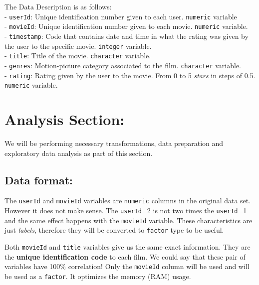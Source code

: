 \documentclass[
]{article}
\begin{document}
The Data Description is as follows:\\
- \texttt{userId}: Unique identification number given to each user.
\texttt{numeric} variable\\
- \texttt{movieId}: Unique identification number given to each movie.
\texttt{numeric} variable.\\
- \texttt{timestamp}: Code that contains date and time in what the
rating was given by the user to the specific movie. \texttt{integer}
variable.\\
- \texttt{title}: Title of the movie. \texttt{character} variable.\\
- \texttt{genres}: Motion-picture category associated to the film.
\texttt{character} variable.\\
- \texttt{rating}: Rating given by the user to the movie. From 0 to 5
\emph{stars} in steps of 0.5. \texttt{numeric} variable.\\
\newpage

\hypertarget{analysis-section}{%
\section{\texorpdfstring{\textbf{Analysis
Section:}}{Analysis Section:}}\label{analysis-section}}

We will be performing necessary transformations, data preparation and
exploratory data analysis as part of this section.

\hypertarget{data-format}{%
\subsection{\texorpdfstring{\textbf{Data
format:}}{Data format:}}\label{data-format}}

The \texttt{userId} and \texttt{movieId} variables are \texttt{numeric}
columns in the original data set. However it does not make sense. The
\texttt{userId}=2 is not two times the \texttt{userId}=1 and the same
effect happens with the \texttt{movieId} variable. These characteristics
are just \emph{labels}, therefore they will be converted to
\texttt{factor} type to be useful.

Both \texttt{movieId} and \texttt{title} variables give us the same
exact information. They are the \textbf{unique identification code} to
each film. We could say that these pair of variables have 100\%
correlation! Only the \texttt{movieId} column will be used and will be
used as a \texttt{factor}. It optimizes the memory (RAM) usage.
\end{document}

